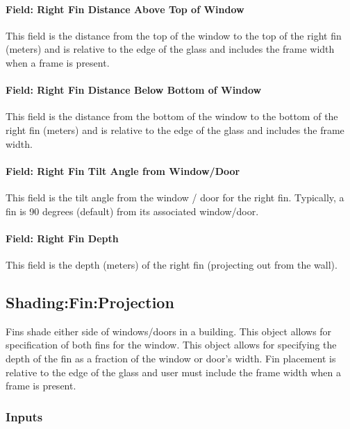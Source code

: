 \paragraph{Field: Right Fin Distance Above Top of Window}\label{field-right-fin-distance-above-top-of-window}

This field is the distance from the top of the window to the top of the right fin (meters) and is relative to the edge of the glass and includes the frame width when a frame is present.

\paragraph{Field: Right Fin Distance Below Bottom of Window}\label{field-right-fin-distance-below-bottom-of-window}

This field is the distance from the bottom of the window to the bottom of the right fin (meters) and is relative to the edge of the glass and includes the frame width.

\paragraph{Field: Right Fin Tilt Angle from Window/Door}\label{field-right-fin-tilt-angle-from-windowdoor}

This field is the tilt angle from the window / door for the right fin. Typically, a fin is 90 degrees (default) from its associated window/door.

\paragraph{Field: Right Fin Depth}\label{field-right-fin-depth}

This field is the depth (meters) of the right fin (projecting out from the wall).

\subsection{Shading:Fin:Projection}\label{shadingfinprojection}

Fins shade either side of windows/doors in a building. This object allows for specification of both fins for the window. This object allows for specifying the depth of the fin as a fraction of the window or door's width. Fin placement is relative to the edge of the glass and user must include the frame width when a frame is present.

\subsubsection{Inputs}\label{inputs-29-002}

